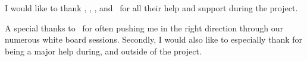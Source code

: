 \vskip 1cm
I would like to thank \FIRSTADVISOR, \SECONDMEMBER, \CHAIRPERSON, and \THIRDMEMBER\ for all their help and support during the project.

A special thanks to \SECONDMEMBER\ for often pushing me in the right direction through our numerous white board sessions.
Secondly, I would also like to especially thank \FIRSTADVISOR for being a major help during, and outside of the project.

\vskip 2cm
\noindent \AUTHOR \\
\PLACE \\
\DATE
